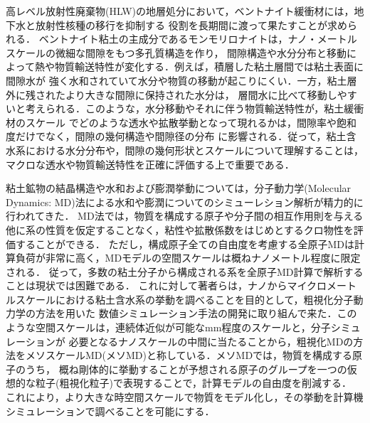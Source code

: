 高レベル放射性廃棄物(HLW)の地層処分において，ベントナイト緩衝材には，地下水と放射性核種の移行を抑制する
役割を長期間に渡って果たすことが求められる．
ベントナイト粘土の主成分であるモンモリロナイトは，ナノ・メートルスケールの微細な間隙をもつ多孔質構造を作り，
間隙構造や水分分布と移動によって熱や物質輸送特性が変化する．例えば，積層した粘土層間では粘土表面に間隙水が
強く水和されていて水分や物質の移動が起こりにくい．一方，粘土層外に残されたより大きな間隙に保持された水分は，
層間水に比べて移動しやすいと考えられる．このような，水分移動やそれに伴う物質輸送特性が，粘土緩衝材のスケール
でどのような透水や拡散挙動となって現れるかは，間隙率や飽和度だけでなく，間隙の幾何構造や間隙径の分布
に影響される．従って，粘土含水系における水分分布や，間隙の幾何形状とスケールについて理解することは，
マクロな透水や物質輸送特性を正確に評価する上で重要である．

粘土鉱物の結晶構造や水和および膨潤挙動については，分子動力学(Molecular Dynamics: MD)法による水和や膨潤についてのシミューレション解析が精力的に行われてきた．
MD法では，物質を構成する原子や分子間の相互作用則を与える他に系の性質を仮定することなく，粘性や拡散係数をはじめとするクロ物性を評価することができる．
ただし，構成原子全ての自由度を考慮する全原子MDは計算負荷が非常に高く，MDモデルの空間スケールは概ねナノメートル程度に限定される．
従って，多数の粘土分子から構成される系を全原子MD計算で解析することは現状では困難である．
これに対して著者らは，ナノからマイクロメートルスケールにおける粘土含水系の挙動を調べることを目的として，粗視化分子動力学の方法を用いた
数値シミュレーション手法の開発に取り組んで来た．このような空間スケールは，連続体近似が可能なmm程度のスケールと，分子シミュレーションが
必要となるナノスケールの中間に当たることから，粗視化MDの方法をメソスケールMD(メソMD)と称している．メソMDでは，物質を構成する原子のうち，
概ね剛体的に挙動することが予想される原子のグループを一つの仮想的な粒子(粗視化粒子)で表現することで，計算モデルの自由度を削減する．
これにより，より大きな時空間スケールで物質をモデル化し，その挙動を計算機シミュレーションで調べることを可能にする．

